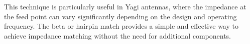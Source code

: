 This technique is particularly useful in Yagi antennas, where the impedance at the feed point can vary significantly depending on the design and operating frequency. The beta or hairpin match provides a simple and effective way to achieve impedance matching without the need for additional components.

